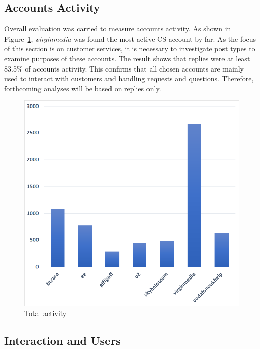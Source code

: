 \documentclass[sigconf]{acmart}
\begin{document}
\subsection{Accounts Activity}

Overall evaluation was carried to measure accounts activity. As shown in
Figure~\ref{fig:totalactivity}, {\emph{virginmedia}} was found the most 
active CS account by far. As the focus of this section is on customer services, 
it is necessary to investigate post types to examine purposes of
these accounts. The result shows that replies were at least 83.5\% of
accounts activity. This confirms that all chosen accounts are mainly
used to interact with customers and handling requests and
questions. Therefore, forthcoming analyses will be based on replies
only. 

\begin{figure}[htb]
\centering
\includegraphics[width=\columnwidth]{images/totalactivity.png}
\caption{Total activity}
\label{fig:totalactivity}
\end{figure}


\subsection{Interaction and Users}
\end{document}
